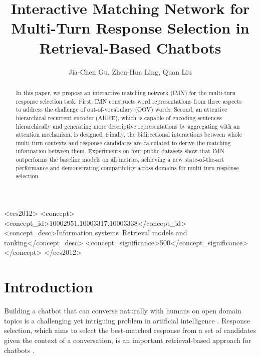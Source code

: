 \documentclass[sigconf]{acmart}
\begin{document}
\fancyhead{}



\title{Interactive Matching Network for Multi-Turn Response Selection in Retrieval-Based Chatbots}







\author{Jia-Chen Gu, Zhen-Hua Ling, Quan Liu}



\begin{abstract}
  In this paper, we propose an interactive matching network (IMN) for the multi-turn response selection task. First, IMN constructs word representations from three aspects to address the challenge of out-of-vocabulary (OOV) words. Second, an attentive hierarchical recurrent encoder (AHRE), which is capable of encoding sentences hierarchically and generating more descriptive representations by aggregating with an attention mechanism, is designed. Finally, the bidirectional interactions between whole multi-turn contexts and response candidates are calculated to derive the matching information between them. Experiments on four public datasets show that IMN outperforms the baseline models on all metrics, achieving a new state-of-the-art performance and demonstrating compatibility across domains for multi-turn response selection.
\end{abstract}

\begin{CCSXML}
<ccs2012>
<concept>
<concept_id>10002951.10003317.10003338</concept_id>
<concept_desc>Information systems~Retrieval models and ranking</concept_desc>
<concept_significance>500</concept_significance>
</concept>
</ccs2012>
\end{CCSXML}




\maketitle

\section{Introduction}
  Building a chatbot that can converse naturally with humans on open domain topics is a challenging yet intriguing problem in artificial intelligence \cite{DBLP:journals/sigkdd/ChenLYT17}. Response selection, which aims to select the best-matched response from a set of candidates given the context of a conversation, is an important retrieval-based approach for chatbots \cite{DBLP:conf/sigdial/LowePSP15,DBLP:conf/acl/WuWXZL17,DBLP:conf/acl/WuLCZDYZL18}.
\end{document}
